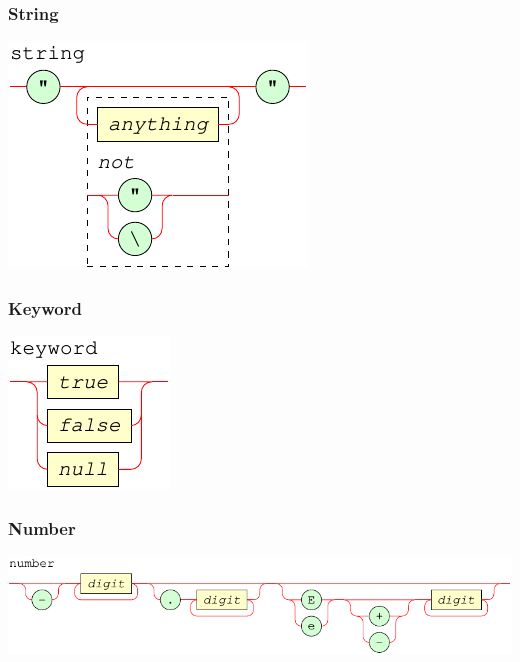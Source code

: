 \documentclass[a4paper]{article}
\begin{document}
\subsubsection{String}


{\centering

   \includegraphics[scale=0.9]{syntax/Lexical/string}

}

\subsubsection{Keyword}


{\centering

   \includegraphics[scale=0.9]{syntax/Lexical/keyword}

}

\newpage

\subsubsection{Number}


{\centering

   \includegraphics[scale=0.9]{syntax/Lexical/number}

}
\end{document}
